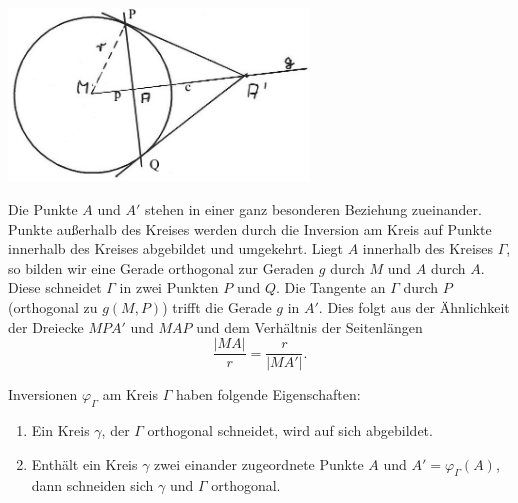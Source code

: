\centerline{\includegraphics[width=8cm]{BILDER/4-2-01-Inversion.jpg}}

Die Punkte $A$ und $A'$ stehen in einer ganz besonderen Beziehung zueinander. Punkte außerhalb des
Kreises werden durch die Inversion am Kreis auf Punkte innerhalb des Kreises abgebildet und
umgekehrt. Liegt $A$ innerhalb des Kreises $\Gamma$, so bilden wir eine Gerade orthogonal zur
Geraden $g$ durch $M$ und $A$ durch $A$. Diese schneidet $\Gamma$ in zwei Punkten $P$ und $Q$. Die
Tangente an $\Gamma$ durch $P$ (orthogonal zu $g(M,P)$) trifft die Gerade $g$ in $A'$. Dies folgt
aus der Ähnlichkeit der Dreiecke $MPA'$ und $MAP$ und dem Verhältnis der Seitenlängen
$$
    \frac{|MA|}{r} = \frac{r}{|MA'|}.
$$
\begin{thm}\label{thm:satz.s4b}
    Inversionen $\varphi_\Gamma$ am Kreis $\Gamma$ haben folgende Eigenschaften:

    \renewcommand{\labelenumi}{\alph{enumi})} %
    \begin{enumerate}
        \item Ein Kreis $\gamma$, der $\Gamma$ orthogonal schneidet, wird auf sich abgebildet.

        \item Enthält ein Kreis $\gamma$ zwei einander zugeordnete Punkte $A$ und
            $A' = \varphi_\Gamma(A)$, dann schneiden sich $\gamma$ und $\Gamma$ orthogonal.

    \end{enumerate}
\end{thm}

